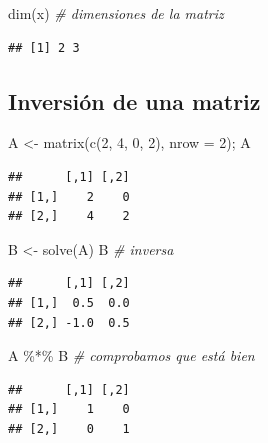 \documentclass[
]{book}
\newenvironment{Shaded}{\begin{snugshade}}{\end{snugshade}}
\newcommand{\AttributeTok}[1]{\textcolor[rgb]{0.77,0.63,0.00}{#1}}
\newcommand{\CommentTok}[1]{\textcolor[rgb]{0.56,0.35,0.01}{\textit{#1}}}
\newcommand{\DecValTok}[1]{\textcolor[rgb]{0.00,0.00,0.81}{#1}}
\newcommand{\FunctionTok}[1]{\textcolor[rgb]{0.00,0.00,0.00}{#1}}
\newcommand{\NormalTok}[1]{#1}
\newcommand{\OtherTok}[1]{\textcolor[rgb]{0.56,0.35,0.01}{#1}}
\newcommand{\SpecialCharTok}[1]{\textcolor[rgb]{0.00,0.00,0.00}{#1}}
\theoremstyle{break}
\theoremstyle{nonumberplain}
\begin{document}
\begin{Shaded}
\begin{Highlighting}[]
\FunctionTok{dim}\NormalTok{(x)  }\CommentTok{\# dimensiones de la matriz}
\end{Highlighting}
\end{Shaded}

\begin{verbatim}
## [1] 2 3
\end{verbatim}

\hypertarget{inversiuxf3n-de-una-matriz}{%
\subsection{Inversión de una matriz}\label{inversiuxf3n-de-una-matriz}}

\begin{Shaded}
\begin{Highlighting}[]
\NormalTok{A }\OtherTok{\textless{}{-}} \FunctionTok{matrix}\NormalTok{(}\FunctionTok{c}\NormalTok{(}\DecValTok{2}\NormalTok{, }\DecValTok{4}\NormalTok{, }\DecValTok{0}\NormalTok{, }\DecValTok{2}\NormalTok{), }\AttributeTok{nrow =} \DecValTok{2}\NormalTok{); A}
\end{Highlighting}
\end{Shaded}

\begin{verbatim}
##      [,1] [,2]
## [1,]    2    0
## [2,]    4    2
\end{verbatim}

\begin{Shaded}
\begin{Highlighting}[]
\NormalTok{B }\OtherTok{\textless{}{-}} \FunctionTok{solve}\NormalTok{(A)}
\NormalTok{B  }\CommentTok{\# inversa}
\end{Highlighting}
\end{Shaded}

\begin{verbatim}
##      [,1] [,2]
## [1,]  0.5  0.0
## [2,] -1.0  0.5
\end{verbatim}

\begin{Shaded}
\begin{Highlighting}[]
\NormalTok{A }\SpecialCharTok{\%*\%}\NormalTok{ B  }\CommentTok{\# comprobamos que está bien}
\end{Highlighting}
\end{Shaded}

\begin{verbatim}
##      [,1] [,2]
## [1,]    1    0
## [2,]    0    1
\end{verbatim}
\end{document}

